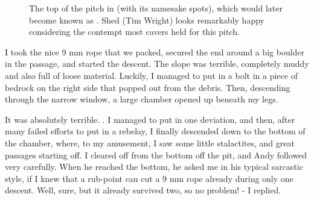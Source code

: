 \begin{figure}[t!]
\checkoddpage \ifoddpage \forcerectofloat \else \forceversofloat \fi
{}
\caption{The top of the pitch in \protect{} (with its namesake spots), which would later become known as \protect{}. Shed (Tim Wright) looks remarkably happy considering the contempt most cavers held for this pitch. }
\end{figure}

I took the nice 9 mm rope that we packed, secured the end around a big boulder in the passage, and started the descent. The slope was terrible, completely muddy and also full of loose material. Luckily, I managed to
put in a bolt in a piece of bedrock on the right side that popped out from the debris. Then, descending through the narrow window, a large chamber opened up beneath my legs.

It was absolutely terrible. . I managed to put in one deviation, and then, after many failed efforts to put in a rebelay, I finally descended down to the bottom of the chamber, where, to my amusement, I saw some little stalactites, and great passages starting off. I cleared off from the bottom off the pit, and Andy followed very carefully. When he reached the bottom, he asked me in his typical sarcastic style, if I knew that a rub-point can cut a 9 mm rope already during only one descent. Well, sure, but it already survived two, so no problem! - I replied.


